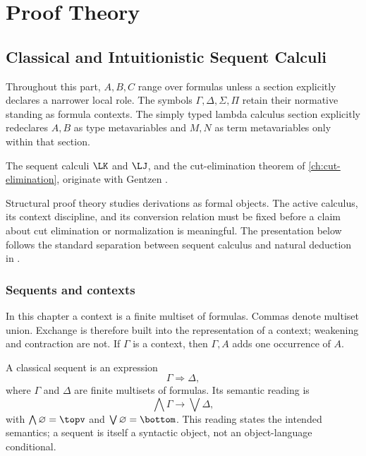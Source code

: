 \part{Proof Theory}
\label{part:proof-theory}

\chapter[Classical and Intuitionistic Calculi]{Classical and Intuitionistic Sequent Calculi}
\label{ch:lk-lj}

\begin{convention}
Throughout this part, \(A,B,C\) range over formulas unless a section explicitly
declares a narrower local role.  The symbols \(\Gamma,\Delta,\Sigma,\Pi\)
retain their normative standing as formula contexts.  The simply typed lambda
calculus section explicitly redeclares \(A,B\) as type metavariables and
\(M,N\) as term metavariables only within that section.
\end{convention}

The sequent calculi \(\LK\) and \(\LJ\), and the cut-elimination
theorem of \cref{ch:cut-elimination}, originate with Gentzen
\cite{Gentzen1934a,Gentzen1935b}.

Structural proof theory studies derivations as formal objects.  The
active calculus, its context discipline, and its conversion relation must be
fixed before a claim about cut elimination or normalization is meaningful.
The presentation below follows the standard separation between sequent
calculus and natural deduction in
\cite{TroelstraSchwichtenberg2000,NegriVonPlato2001}.

\section{Sequents and contexts}
\label{sec:lk-lj-01}

\begin{convention}[Contexts]
In this chapter a context is a finite multiset of formulas.  Commas denote
multiset union.  Exchange is therefore built into the representation of a
context; weakening and contraction are not.  If \(\Gamma\) is a context, then
\(\Gamma,A\) adds one occurrence of \(A\).
\end{convention}

\begin{definition}
A classical sequent is an expression
\[
  \Gamma\Rightarrow\Delta,
\]
where \(\Gamma\) and \(\Delta\) are finite multisets of formulas.  Its semantic
reading is
\[
  \bigwedge\Gamma\to\bigvee\Delta,
\]
with \(\bigwedge\varnothing=\topv\) and
\(\bigvee\varnothing=\bottom\).  This reading states the intended semantics; a
sequent is itself a syntactic object, not an object-language conditional.
\end{definition}

